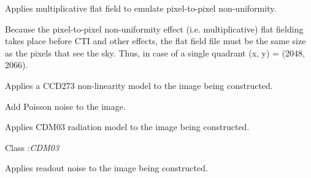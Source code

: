 \documentclass[a4paper,11pt,english]{sphinxmanual}
\begin{document}
\begin{fulllineitems}
\begin{fulllineitems}
\label{simulator:simulator.simulator.VISsimulator.applyFlatfield}
Applies multiplicative flat field to emulate pixel-to-pixel non-uniformity.

Because the pixel-to-pixel non-uniformity effect (i.e. multiplicative) flat fielding takes place
before CTI and other effects, the flat field file must be the same size as the pixels that see
the sky. Thus, in case of a single quadrant (x, y) = (2048, 2066).

\end{fulllineitems}


\begin{fulllineitems}
\label{simulator:simulator.simulator.VISsimulator.applyNonlinearity}
Applies a CCD273 non-linearity model to the image being constructed.

\end{fulllineitems}


\begin{fulllineitems}
\label{simulator:simulator.simulator.VISsimulator.applyPoissonNoise}
Add Poisson noise to the image.

\end{fulllineitems}


\begin{fulllineitems}
\label{simulator:simulator.simulator.VISsimulator.applyRadiationDamage}
Applies CDM03 radiation model to the image being constructed.




Class :\emph{CDM03}



\end{fulllineitems}


\begin{fulllineitems}
\label{simulator:simulator.simulator.VISsimulator.applyReadoutNoise}
Applies readout noise to the image being constructed.


\end{fulllineitems}
\end{fulllineitems}
\end{document}

